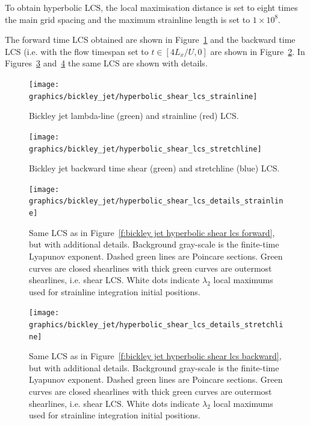 \documentclass{article}
\begin{document}
To obtain hyperbolic LCS, the local maximisation distance is set to eight times the main grid spacing and the maximum strainline length is set to $1 \times 10^8$.

The forward time LCS obtained are shown in Figure~\ref{f:bickley jet hyperbolic shear lcs strainline} and the backward time LCS (i.e. with the flow timespan set to $t \in [4 L_x/U,0]$ are shown in Figure~\ref{f:bickley jet hyperbolic shear lcs stretchline}. In Figures~\ref{f:bickley jet hyperbolic shear lcs details forward} and~\ref{f:bickley jet hyperbolic shear lcs details backward} the same LCS are shown with details.

\begin{figure}
\begin{center}
\texttt{[image: graphics/bickley\_jet/hyperbolic\_shear\_lcs\_strainline]}
\end{center}
\caption{Bickley jet lambda-line (green) and strainline (red) LCS.}
\label{f:bickley jet hyperbolic shear lcs strainline}
\end{figure}

\begin{figure}
\begin{center}
\texttt{[image: graphics/bickley\_jet/hyperbolic\_shear\_lcs\_stretchline]}
\end{center}
\caption{Bickley jet backward time shear (green) and stretchline (blue) LCS.}
\label{f:bickley jet hyperbolic shear lcs stretchline}
\end{figure}

\begin{figure}
\begin{center}
\texttt{[image: graphics/bickley\_jet/hyperbolic\_shear\_lcs\_details\_strainline]}
\end{center}
\caption{Same LCS as in Figure~\ref{f:bickley jet hyperbolic shear lcs forward}, but with additional details. Background gray-scale is the finite-time Lyapunov exponent. Dashed green lines are Poincare sections. Green curves are closed shearlines with thick green curves are outermost shearlines, i.e. shear LCS. White dots indicate $\lambda_2$ local maximums used for strainline integration initial positions.}
\label{f:bickley jet hyperbolic shear lcs details forward}
\end{figure}

\begin{figure}
\begin{center}
\texttt{[image: graphics/bickley\_jet/hyperbolic\_shear\_lcs\_details\_stretchline]}
\end{center}
\caption{Same LCS as in Figure~\ref{f:bickley jet hyperbolic shear lcs backward}, but with additional details. Background gray-scale is the finite-time Lyapunov exponent. Dashed green lines are Poincare sections. Green curves are closed shearlines with thick green curves are outermost shearlines, i.e. shear LCS. White dots indicate $\lambda_2$ local maximums used for strainline integration initial positions.}
\label{f:bickley jet hyperbolic shear lcs details backward}
\end{figure}
\end{document}
